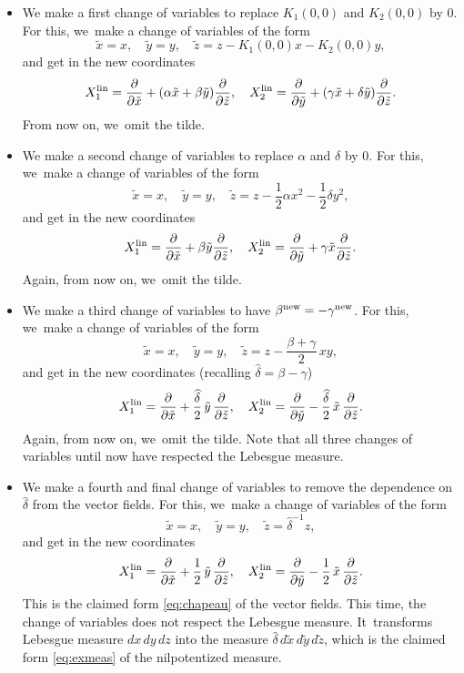 \documentclass[10pt]{amsart}
\newcommand{\lin}{\textup{lin}}
\newcommand{\new}{\textup{new}}
\theoremstyle{definition}
\newcommand{\1}{\mathbbm{1}}
\begin{document}
\begin{itemize}
\item We make a first change of variables to replace $K_1(0,0)$ and $K_2(0,0)$ by $0$.
For this, we~make a change of variables of the form
\[
\tilde x = x,\quad
\tilde y =y,\quad \tilde z = z - K_1(0,0) x - K_2(0,0) y,
\]
and get in the new coordinates
\[
X_1^\lin= \frac{\partial}{\partial \tilde x} + (\alpha \tilde x + \beta \tilde y) \frac{\partial}{\partial \tilde z},\quad
X_2^\lin= \frac{\partial}{\partial \tilde y} +(\gamma \tilde x + \delta \tilde y) \frac{\partial}{\partial \tilde z}.
\]
From now on, we~omit the tilde.
\item We make a second change of variables to replace $\alpha$ and $\delta$ by $0$.
For this, we~make a change of variables of the form
\[
\tilde x = x,\quad \tilde y =y,\quad \tilde z = z - \frac 12 \alpha x^2 - \frac 12 \delta y^2,
\]
and get in the new coordinates
\[
X_1^\lin= \frac{\partial}{\partial \tilde x} + \beta \tilde y \frac{\partial}{\partial \tilde z},\quad
X_2^\lin= \frac{\partial}{\partial \tilde y} + \gamma \tilde x \frac{\partial}{\partial \tilde z}.
\]
Again, from now on, we~omit the tilde.
\item We make a third change of variables to have $\beta^\new = - \gamma^\new$.
For this, we~make a change of variables of the form
\[
\tilde x = x,\quad \tilde y =y,\quad \tilde z = z - \frac{\beta+\gamma}2\,xy,
\]
and get in the new coordinates (recalling $\widehat\delta = \beta - \gamma$)
\[
X_1^\lin= \frac{\partial}{\partial \tilde x} + \frac{\widehat\delta}{2}\,\tilde y\,\frac{\partial}{\partial \tilde z},\quad
X_2^\lin= \frac{\partial}{\partial \tilde y} - \frac{\widehat\delta}{2}\,\tilde x\,\frac{\partial}{\partial \tilde z}.
\]
Again, from now on, we~omit the tilde.
Note that all three changes of variables until now have respected the Lebesgue measure.
\item We make a fourth and final change of variables to remove the dependence on $\widehat\delta$ from the vector fields.
For this, we~make a change of variables of the form
\[
\tilde x = x,\quad \tilde y =y,\quad \tilde z = \widehat \delta^{-1} z,
\]
and get in the new coordinates
\[
X_1^\lin= \frac{\partial}{\partial \tilde x} + \frac{1}{2}\,\tilde y\,\frac{\partial}{\partial \tilde z},\quad
X_2^\lin= \frac{\partial}{\partial \tilde y} - \frac{1}{2}\,\tilde x\,\frac{\partial}{\partial \tilde z}.
\]
This is the claimed form \eqref{eq:chapeau} of the vector fields.
This time, the change of variables does not respect the Lebesgue measure. It~transforms Lebesgue measure $dx\,dy\,dz$ into the measure $\widehat\delta\,d\tilde x\,d\tilde y\,d\tilde z$, which is the claimed form \eqref{eq:exmeas} of the nilpotentized measure.
\end{itemize}
\end{document}
